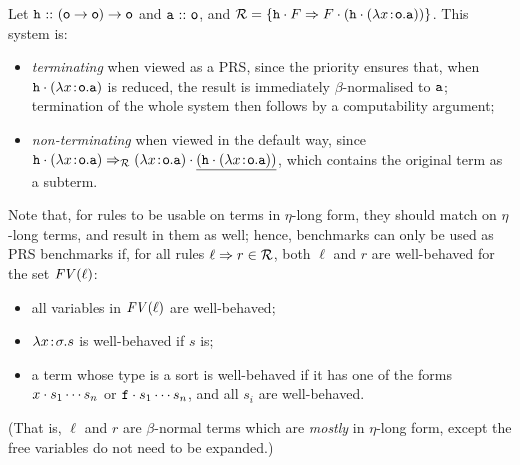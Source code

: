 \begin{example}
Let $\mathtt{h} \ \mathtt{::}\  (\mathsf{o} \rightarrow \mathsf{o}) \rightarrow \mathsf{o}$ and $\mathtt{a} \ \mathtt{::}\  \mathsf{o}$,
and $\mathcal{R} = \{ \mathtt{h} \cdot F \Rightarrow F \cdot (\mathtt{h} \cdot (\lambda x\!:\!\mathsf{o}.\mathtt{a})) \}$.
This system is:
\begin{itemize}
\item \emph{terminating} when viewed as a PRS, since the priority ensures that, when
  $\mathtt{h} \cdot (\lambda x\!:\!\mathsf{o}.\mathtt{a})$ is reduced, the result is immediately
  $\beta$-normalised to $\mathtt{a}$; termination of the whole system then follows by a computability
  argument;
\item \emph{non-terminating} when viewed in the default way, since
  $\mathtt{h} \cdot (\lambda x\!:\!\mathsf{o}.\mathtt{a}) \Rightarrow_{\mathcal{R}}
  (\lambda x\!:\!\mathsf{o}.\mathtt{a}) \cdot \underline{(\mathtt{h} \cdot (\lambda x\!:\!\mathsf{o}.\mathtt{a}))}$,
  which contains the original term as a subterm.
\end{itemize}
\end{example}

Note that, for rules to be usable on terms in $\eta$-long form, they should match on $\eta$-long
terms, and result in them as well; hence, benchmarks can only be used as PRS benchmarks if, for all
rules $\ell \Rightarrow r \in \mathcal{R}$, both $\ell$ and $r$ are well-behaved for the set $\mathit{FV}(\ell)$:
\begin{itemize}
\item all variables in $\mathit{FV}(\ell)$ are well-behaved;
\item $\lambda x\!:\!\sigma.s$ is well-behaved if $s$ is;
\item a term whose type is a sort is well-behaved if it has one of the forms
  $x \cdot s_1 \cdots s_n$ or $\mathtt{f} \cdot s_1 \cdots s_n$, and all $s_i$ are well-behaved.
\end{itemize}
(That is, $\ell$ and $r$ are $\beta$-normal terms which are \emph{mostly} in $\eta$-long form,
except the free variables do not need to be expanded.)
